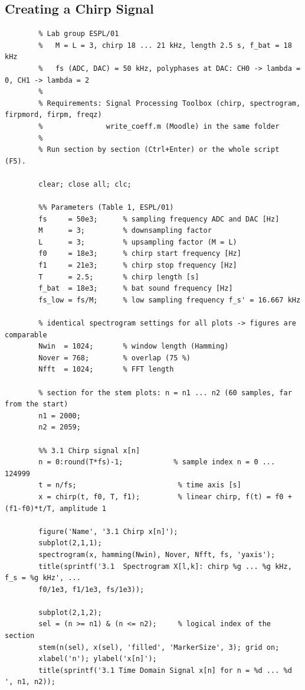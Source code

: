 \documentclass[a4paper,11pt]{article}
\begin{document}
	
	\subsection{Creating a Chirp Signal}
	
	\noindent{}
	
	\medskip
	\newpage
	\begin{lstlisting}[style=matlab, caption={MATLAB code, parameters and Section 3.1}, label={lst:m31}]
		%% ESP Lab 1 - Preparation: Signal Modulation by Decimation and Interpolation
		% Lab group ESPL/01
		%   M = L = 3, chirp 18 ... 21 kHz, length 2.5 s, f_bat = 18 kHz
		%   fs (ADC, DAC) = 50 kHz, polyphases at DAC: CH0 -> lambda = 0, CH1 -> lambda = 2
		%
		% Requirements: Signal Processing Toolbox (chirp, spectrogram, firpmord, firpm, freqz)
		%               write_coeff.m (Moodle) in the same folder
		%
		% Run section by section (Ctrl+Enter) or the whole script (F5).
		
		clear; close all; clc;
		
		%% Parameters (Table 1, ESPL/01)
		fs     = 50e3;      % sampling frequency ADC and DAC [Hz]
		M      = 3;         % downsampling factor
		L      = 3;         % upsampling factor (M = L)
		f0     = 18e3;      % chirp start frequency [Hz]
		f1     = 21e3;      % chirp stop frequency [Hz]
		T      = 2.5;       % chirp length [s]
		f_bat  = 18e3;      % bat sound frequency [Hz]
		fs_low = fs/M;      % low sampling frequency f_s' = 16.667 kHz
		
		% identical spectrogram settings for all plots -> figures are comparable
		Nwin  = 1024;       % window length (Hamming)
		Nover = 768;        % overlap (75 %)
		Nfft  = 1024;       % FFT length
		
		% section for the stem plots: n = n1 ... n2 (60 samples, far from the start)
		n1 = 2000;
		n2 = 2059;
		
		%% 3.1 Chirp signal x[n]
		n = 0:round(T*fs)-1;            % sample index n = 0 ... 124999
		t = n/fs;                        % time axis [s]
		x = chirp(t, f0, T, f1);         % linear chirp, f(t) = f0 + (f1-f0)*t/T, amplitude 1
		
		figure('Name', '3.1 Chirp x[n]');
		subplot(2,1,1);
		spectrogram(x, hamming(Nwin), Nover, Nfft, fs, 'yaxis');
		title(sprintf('3.1  Spectrogram X[l,k]: chirp %g ... %g kHz, f_s = %g kHz', ...
		f0/1e3, f1/1e3, fs/1e3));
		
		subplot(2,1,2);
		sel = (n >= n1) & (n <= n2);     % logical index of the section
		stem(n(sel), x(sel), 'filled', 'MarkerSize', 3); grid on;
		xlabel('n'); ylabel('x[n]');
		title(sprintf('3.1 Time Domain Signal x[n] for n = %d ... %d ', n1, n2));
	\end{lstlisting}
	
\end{document}
